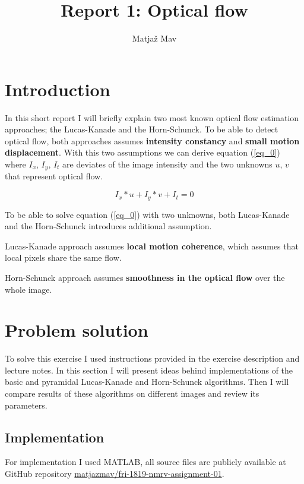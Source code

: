 \documentclass[runningheads]{llncs}
\begin{document}
% 
\title{Report 1: Optical flow}
\author{Matjaž Mav}
%
\maketitle              %
%

\section{Introduction}
In this short report I will briefly explain two most known optical flow estimation approaches; the Lucas-Kanade and the Horn-Schunck. To be able to detect optical flow, both approaches assumes \textbf{intensity constancy} and \textbf{small motion displacement}. With this two assumptions we can derive equation (\ref{eq_0}) where $I_x$, $I_y$, $I_t$ are deviates of the image intensity and the two unknowns $u$, $v$ that represent optical flow.

\begin{equation}
\label{eq_0}
I_x*u+I_y*v+I_t = 0
\end{equation}

To be able to solve equation (\ref{eq_0}) with two unknowns, both Lucas-Kanade and the Horn-Schunck introduces additional assumption.

Lucas-Kanade approach assumes \textbf{local motion coherence}, which assumes that local pixels share the same flow.

Horn-Schunck approach assumes \textbf{smoothness in the optical flow} over the whole image.

\section{Problem solution}
To solve this exercise I used instructions provided in the exercise description and lecture notes. In this section I will present ideas behind implementations of the basic and pyramidal Lucas-Kanade and Horn-Schunck algorithms. Then I will compare results of these algorithms on different images and review its parameters.

\subsection{Implementation}
For implementation I used MATLAB, all source files are publicly available at GitHub repository \href{https://github.com/matjazmav/fri-1819-nmrv-assignment-01}{matjazmav/fri-1819-nmrv-assignment-01}.
\end{document}

